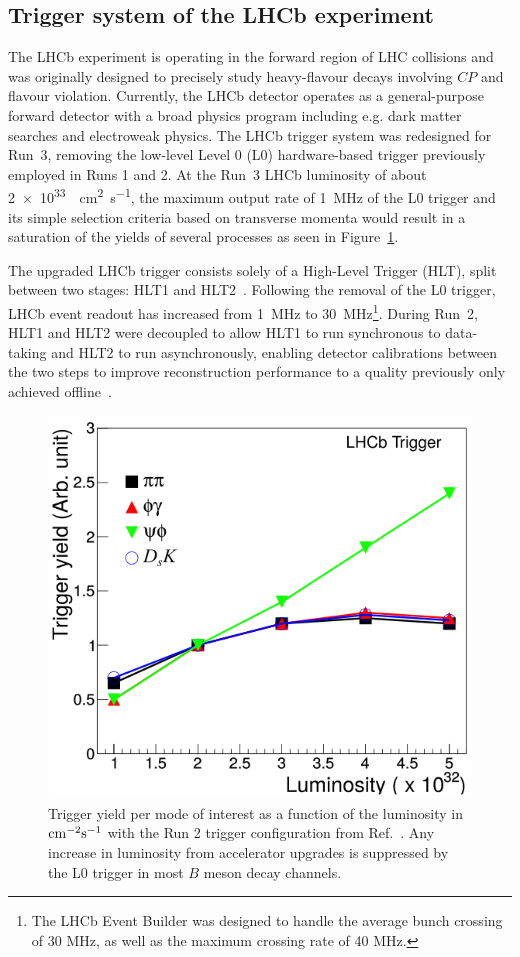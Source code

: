 \subsection{Trigger system of the LHCb experiment}

The LHCb experiment is operating in the forward region of LHC collisions and was originally designed to precisely study heavy-flavour decays involving $CP$ and flavour violation.
Currently, the LHCb detector operates as a general-purpose forward detector with a broad physics program including e.g. dark matter searches and electroweak physics. 
The LHCb trigger system was redesigned for Run~3, removing the low-level Level 0 (L0) hardware-based trigger previously employed in Runs 1 and 2. 
At the Run~3 LHCb luminosity of about \SI{2e33}{\per\square\cm\per\second}, the maximum output rate of \SI{1}{\mega\hertz} of the L0 trigger and its simple selection criteria based on transverse momenta would result in a saturation of the yields of several processes as seen in Figure~\ref{fig:LHCbL0TriggerYield}. 

The upgraded LHCb trigger consists solely of a High-Level Trigger (HLT), split between two stages: HLT1 and HLT2~\cite{Aaij:2019uij}. Following the removal of the L0 trigger, LHCb event readout has increased from \SI{1}{\mega\hertz} to \SI{30}{\mega\hertz}\footnote{The LHCb Event Builder was designed to handle the average bunch crossing of 30 MHz, as well as the maximum crossing rate of 40 MHz.}. During Run~2, HLT1 and HLT2 were decoupled to allow HLT1 to run synchronous to data-taking and HLT2 to run asynchronously, enabling detector calibrations between the two steps to improve reconstruction performance to a quality previously only achieved offline~\cite{LHCb:Albrecht_2015}.


\begin{figure}[h!]
    \centering
    \includegraphics[width=0.55\linewidth]{images/lhcb/LHCb-L0-yield.png}
    \caption{Trigger yield per mode of interest as a function of the luminosity in ${\rm cm}^{-2}{\rm s}^{-1}$ with the Run 2 trigger configuration from Ref.~\cite{LHCb:upgrade-piucci}. Any increase in luminosity from accelerator upgrades is suppressed by the L0 trigger in most $B$ meson decay channels.}
    \label{fig:LHCbL0TriggerYield}
\end{figure}

